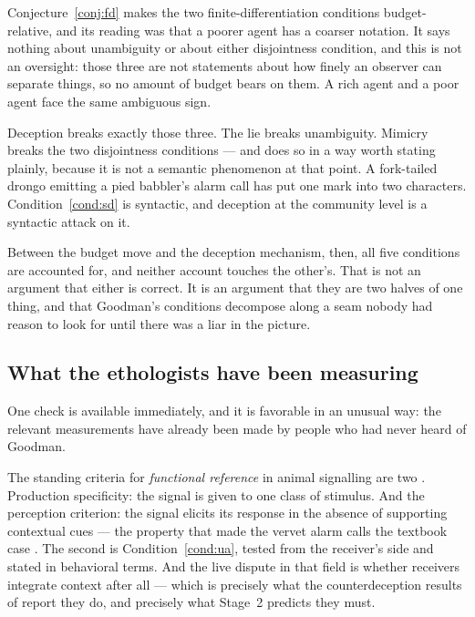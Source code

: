 Conjecture~\ref{conj:fd} makes the two finite-differentiation conditions
budget-relative, and its reading was that a poorer agent has a coarser notation.
It says nothing about unambiguity or about either disjointness condition, and
this is not an oversight: those three are not statements about how finely an
observer can separate things, so no amount of budget bears on them. A rich agent
and a poor agent face the same ambiguous sign.

Deception breaks exactly those three. The lie breaks unambiguity. Mimicry breaks
the two disjointness conditions --- and does so in a way worth stating plainly,
because it is not a semantic phenomenon at that point. A fork-tailed drongo
emitting a pied babbler's alarm call \cite{flower2011,flower2014} has put one
mark into two characters. Condition~\ref{cond:sd} is syntactic, and deception at
the community level is a syntactic attack on it.

Between the budget move and the deception mechanism, then, all five conditions
are accounted for, and neither account touches the other's. That is not an
argument that either is correct. It is an argument that they are two halves of
one thing, and that Goodman's conditions decompose along a seam nobody had
reason to look for until there was a liar in the picture.

\subsection{What the ethologists have been measuring}
\label{sec:functional-reference}

One check is available immediately, and it is favorable in an unusual way: the
relevant measurements have already been made by people who had never heard of
Goodman.

The standing criteria for \emph{functional reference} in animal signalling are
two \cite{macedonia1993}. Production specificity: the signal is given to one
class of stimulus. And the perception criterion: the signal elicits its response
in the absence of supporting contextual cues --- the property that made the
vervet alarm calls the textbook case \cite{seyfarth1980}. The second is Condition~\ref{cond:ua}, tested from
the receiver's side and stated in behavioral terms. And the live dispute in that
field is whether receivers integrate context after all --- which is precisely
what the counterdeception results of \cite{wheelerbc2010,wheelerbc2013} report
they do, and precisely what Stage~2 predicts they must.

